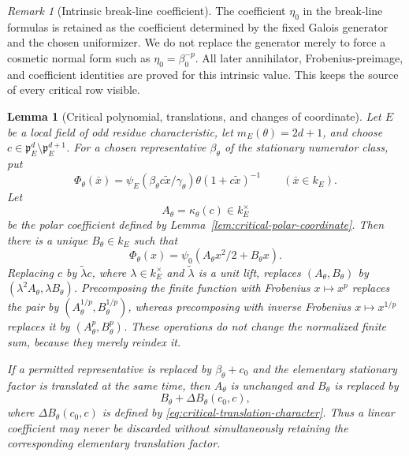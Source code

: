 \documentclass[11pt]{amsart}
\newtheorem{lemma}[theorem]{Lemma}
\theoremstyle{definition}
\theoremstyle{remark}
\newtheorem{remark}[theorem]{Remark}
\newcommand{\p}{\mathfrak p}
\begin{document}
\begin{remark}[Intrinsic break-line coefficient]
\label{rem:intrinsic-break-line-coefficient}
The coefficient $\eta_0$ in the break-line formulas is retained as the
coefficient determined by the fixed Galois generator and the chosen
uniformizer.  We do not replace the generator merely to force a cosmetic
normal form such as $\eta_0=\beta_0^{-p}$.  All later annihilator,
Frobenius-preimage, and coefficient identities are proved for this
intrinsic value.  This keeps the source of every critical row visible.
\end{remark}

\begin{lemma}[Critical polynomial, translations, and changes of coordinate]
\label{lem:critical-polynomial-coordinate}
Let $E$ be a local field of odd residue characteristic, let
$m_E(\theta)=2d+1$, and choose $c\in\p_E^d\setminus\p_E^{d+1}$.
For a chosen representative $\beta_\theta$ of the stationary
numerator class, put
\[
 \Phi_\theta(\bar x)=
 \psi_E(\beta_\theta c\widetilde x/\gamma_\theta)
 \theta(1+c\widetilde x)^{-1}\qquad(\bar x\in k_E).
\]
Let
\[
 A_\theta=\kappa_\theta(c)\in k_E^\times
\]
be the polar coefficient defined by
Lemma~\ref{lem:critical-polar-coordinate}.  Then there is a unique
$B_\theta\in k_E$ such that
\[
 \Phi_\theta(x)=
 \psi_0(A_\theta x^2/2+B_\theta x).
\]
Replacing $c$ by $\widetilde\lambda c$, where
$\lambda\in k_E^\times$ and $\widetilde\lambda$ is a unit lift,
replaces $(A_\theta,B_\theta)$ by
$(\lambda^2A_\theta,\lambda B_\theta)$.  Precomposing the finite
function with Frobenius $x\mapsto x^p$ replaces the pair by
$(A_\theta^{1/p},B_\theta^{1/p})$, whereas precomposing with inverse
Frobenius $x\mapsto x^{1/p}$ replaces it by
$(A_\theta^p,B_\theta^p)$.  These operations do not change the
normalized finite sum, because they merely reindex it.

If a permitted representative is replaced by
$\beta_\theta+c_0$ and the elementary stationary factor is translated
at the same time, then $A_\theta$ is unchanged and
$B_\theta$ is replaced by
\[
 B_\theta+\Delta B_\theta(c_0,c),
\]
where $\Delta B_\theta(c_0,c)$ is defined by
\eqref{eq:critical-translation-character}.  Thus a linear coefficient
may never be discarded without simultaneously retaining the
corresponding elementary translation factor.
\end{lemma}
\end{document}
